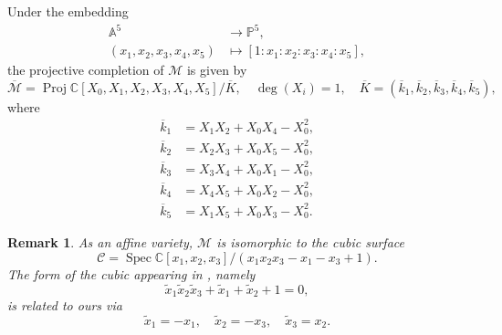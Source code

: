 \documentclass[a4paper,reqno]{amsart}
\numberwithin{equation}{section}
\newcommand{\C}{\mathbb{C}}
\newcommand{\p}{\mathbb{P}}
\DeclareMathOperator{\Spec}{Spec}
\newtheorem{remark}[theorem]{Remark}
\numberwithin{equation}{section}
\begin{document}
Under the embedding 
\begin{equation*}
    \begin{aligned}
        \mathbb{A}^5 &\to \p^5, \\
        (x_1,x_2,x_3,x_4,x_5) &\mapsto [1:x_1:x_2:x_3:x_4:x_5],
    \end{aligned}
\end{equation*}
the projective completion of $\mathcal{M}$ is given by 
\begin{equation*}
    \overline{\mathcal{M}} = \operatorname{Proj}\C[X_0,X_1,X_2,X_3,X_4,X_5]/\overline{K}, \quad \operatorname{deg}(X_i)=1, \quad \overline{K} = (\overline{k}_1,\overline{k}_2,\overline{k}_3,\overline{k}_4,\overline{k}_5),
\end{equation*}
where 
\begin{align*}
\overline{k}_1 &= X_1X_2+X_0X_4-X_0^2, \\
\overline{k}_2 &= X_2X_3+X_0X_5-X_0^2, \\
\overline{k}_3 &= X_3X_4+X_0X_1-X_0^2, \\
\overline{k}_4 &= X_4X_5+X_0X_2-X_0^2, \\
\overline{k}_5 &= X_1X_5+X_0X_3-X_0^2.
\end{align*}


\begin{remark}
    As an affine variety, $\mathcal{M}$ is isomorphic to the cubic surface 
    $$ \mathcal{C} = \Spec \C[x_1,x_2,x_3]/( x_1x_2x_3-x_1-x_3+1).$$
    The form of the cubic appearing in \cite{putsaito}, namely 
$$\tilde{x}_1\tilde{x}_2\tilde{x}_3+\tilde{x}_1+\tilde{x}_2+1=0,$$
    is related to ours via 
    $$\tilde{x}_1=-x_1, \quad \tilde{x}_2 = -x_3, \quad \tilde{x}_3 = x_2.$$
\end{remark}
\end{document}
